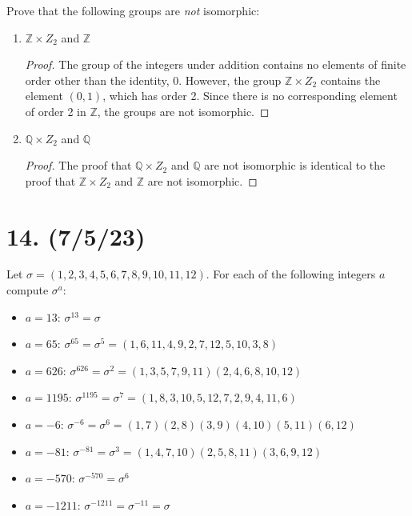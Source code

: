 \documentclass{article}
\begin{document}
Prove that the following groups are \emph{not} isomorphic:

\begin{enumerate}[label=(\alph*), itemsep=0em]
    \item $\mathbb{Z} \times Z_2$ and $\mathbb{Z}$
          \begin{proof}
            The group of the integers under addition contains no elements of finite order other than the identity, 0. However, the group $\mathbb{Z} \times Z_2$ contains the element $(0, 1)$, which has order 2. Since there is no corresponding element of order 2 in $\mathbb{Z}$, the groups are not isomorphic.
          \end{proof}
    \item $\mathbb{Q} \times Z_2$ and $\mathbb{Q}$
          \begin{proof}
            The proof that $\mathbb{Q} \times Z_2$ and $\mathbb{Q}$ are not isomorphic is identical to the proof that $\mathbb{Z} \times Z_2$ and $\mathbb{Z}$ are not isomorphic.
          \end{proof}
\end{enumerate}

\section*{14. (7/5/23)}

Let $\sigma = (1, 2, 3, 4, 5, 6, 7, 8, 9, 10, 11, 12)$. For each of the following integers $a$ compute $\sigma^a$:

\begin{itemize}[itemsep=0em]
    \item $a = 13$: $\sigma^{13} = \sigma$
    \item $a = 65$: $\sigma^{65} = \sigma^5 = (1, 6, 11, 4, 9, 2, 7, 12, 5, 10, 3, 8)$
    \item $a = 626$: $\sigma^{626} = \sigma^2 = (1, 3, 5, 7, 9, 11)(2, 4, 6, 8, 10, 12)$
    \item $a = 1195$: $\sigma^{1195} = \sigma^7 = (1, 8, 3, 10, 5, 12, 7, 2, 9, 4, 11, 6)$
    \item $a = -6$: $\sigma^{-6} = \sigma^6 = (1, 7)(2, 8)(3, 9)(4, 10)(5, 11)(6, 12)$
    \item $a = -81$: $\sigma^{-81} = \sigma^3 = (1, 4, 7, 10)(2, 5, 8, 11)(3, 6, 9, 12)$
    \item $a = -570$: $\sigma^{-570} = \sigma^6$
    \item $a = -1211$: $\sigma^{-1211} = \sigma^{-11} = \sigma$
\end{itemize}
\end{document}
